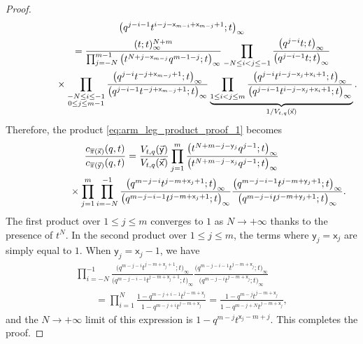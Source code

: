 \documentclass[11pt]{article}
\numberwithin{equation}{section}
\numberwithin{equation}{section}
\begin{document}
\begin{proof}
\begin{gather*}
		{\big(q^{j-i-1}t^{i-j-\mathsf{x}_{m-i}+\mathsf{x}_{m-j}+1};t\big)_{\infty}}
		\\
\hphantom{c_{\overline\pi(\vec{\mathsf{x}})}(q,t)}{}
		=
		\frac{(t;t)_{\infty}^{N+m}}
		{
			\prod_{j=-N}^{m-1}
			\big(t^{N+j-\mathsf{x}_{m-j}}q^{m-1-j};t\big)_{\infty}
		}
		\prod_{-N\le i<j\le -1}
		\frac{\big(q^{j-i}t;t\big)_{\infty}}
		{\big(q^{j-i-1}t;t\big)_{\infty}}
		\\
\hphantom{c_{\overline\pi(\vec{\mathsf{x}})}(q,t)=}{}
\times
		\prod_{\substack{-N\le i\le -1 \\ 0\le j\le m-1}}
		\frac{\big(q^{j-i}t^{-j+\mathsf{x}_{m-j}+1};t\big)_{\infty}}
		{\big(q^{j-i-1}t^{-j+\mathsf{x}_{m-j}+1};t\big)_{\infty}}
		\underbrace{
		\prod_{1\le i<j\le m}
		\frac{\big(q^{j-i}t^{i-j-\mathsf{x}_{j}+\mathsf{x}_{i}+1};t\big)_{\infty}}
		{\big(q^{j-i-1}t^{i-j-\mathsf{x}_{j}+\mathsf{x}_{i}+1};t\big)_{\infty}}}
		_{1/V_{t,q}(\vec{\mathsf{x}})}.
	\end{gather*}
	Therefore,
	the product \eqref{eq:arm_leg_product_proof_1}
	becomes
	\begin{gather*}
		\frac{c_{\overline\pi(\vec{\mathsf{x}})}(q,t)}
		{c_{\overline\pi(\vec{\mathsf{y}})}(q,t)}
		=
		\frac{V_{t,q}(\vec{\mathsf{y}})}
		{V_{t,q}(\vec{\mathsf{x}})}
			\prod_{j=1}^{m}
		\frac{
			\big(t^{N+m-j-\mathsf{y}_{j}}q^{j-1};t\big)_{\infty}
		}
		{
			\big(t^{N+m-j-\mathsf{x}_{j}}q^{j-1};t\big)_{\infty}
		}\\
\hphantom{\frac{c_{\overline\pi(\vec{\mathsf{x}})}(q,t)}
		{c_{\overline\pi(\vec{\mathsf{y}})}(q,t)}=}{}
\times
		\prod_{j=1}^{m}
		\prod_{i=-N}^{-1}
		\frac{\big(q^{m-j-i}t^{j-m+\mathsf{x}_{j}+1};t\big)_{\infty}}
		{\big(q^{m-j-i-1}t^{j-m+\mathsf{x}_{j}+1};t\big)_{\infty}}
		\frac
		{\big(q^{m-j-i-1}t^{j-m+\mathsf{y}_{j}+1};t\big)_{\infty}}
		{\big(q^{m-j-i}t^{j-m+\mathsf{y}_{j}+1};t\big)_{\infty}}.
	\end{gather*}
	The first product over $1\le j\le m$
	converges to $1$ as $N\to+\infty$
	thanks to the presence of $t^N$.
	In the second product over $1\le j\le m$, the terms
	where $\mathsf{y}_j=\mathsf{x}_j$ are simply equal to $1$.
	When $\mathsf{y}_j=\mathsf{x}_j-1$, we have
	\begin{gather*}
		\prod_{i=-N}^{-1}
		\frac{\big(q^{m-j-i}t^{j-m+\mathsf{x}_{j}+1};t\big)_{\infty}}
		{\big(q^{m-j-i-1}t^{j-m+\mathsf{x}_{j}+1};t\big)_{\infty}}
		\frac
		{\big(q^{m-j-i-1}t^{j-m+\mathsf{x}_{j}};t\big)_{\infty}}
		{\big(q^{m-j-i}t^{j-m+\mathsf{x}_{j}};t\big)_{\infty}}
	\\
\qquad{}	 =
		\prod_{i=1}^{N}
		\frac{1-q^{m-j+i-1}t^{j-m+\mathsf{x}_{j}}}
		{1-q^{m-j+i}t^{j-m+\mathsf{x}_{j}}}
	 =
		\frac{1-q^{m-j}t^{j-m+\mathsf{x}_{j}}}
		{1-q^{m-j+N}t^{j-m+\mathsf{x}_{j}}},
	\end{gather*}
	and the $N\to+\infty$ limit of this expression is
	$1-q^{m-j}t^{\mathsf{x}_{j}-m+j}$.
	This completes the proof.
\end{proof}
\end{document}
